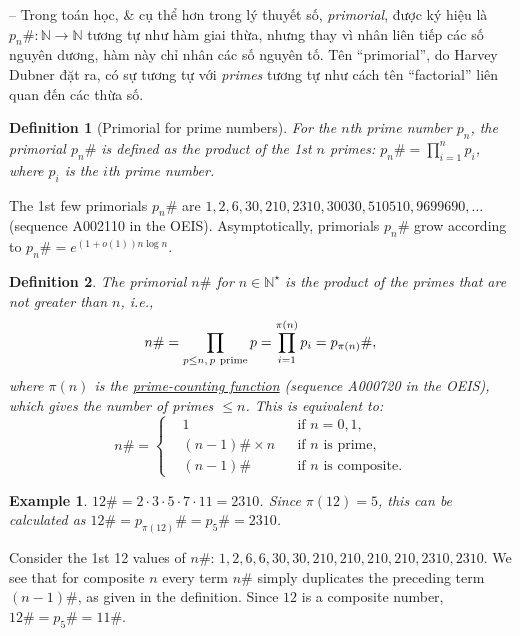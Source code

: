 \documentclass{article}
\newtheorem{definition}{Definition}
\newtheorem{example}{Example}
\begin{document}
-- Trong toán học, \& cụ thể hơn trong lý thuyết số, {\it primorial}, được ký hiệu là $p_n\#:\mathbb{N}\to\mathbb{N}$ tương tự như hàm giai thừa, nhưng thay vì nhân liên tiếp các số nguyên dương, hàm này chỉ nhân các số nguyên tố. Tên ``primorial'', do {\sc Harvey Dubner} đặt ra, có sự tương tự với {\it primes} tương tự như cách tên ``factorial'' liên quan đến các thừa số.

\begin{definition}[Primorial for prime numbers]
	For the $n$th prime number $p_n$, the primorial $p_n\#$ is defined as the product of the 1st $n$ primes: $p_n\# = \prod_{i=1}^n p_i$, where $p_i$ is the $i$th prime number.
\end{definition}
The 1st few primorials $p_n\#$ are $1, 2, 6, 30, 210, 2310, 30030, 510510, 9699690,\ldots$ (sequence A002110 in the OEIS). Asymptotically, primorials $p_n\#$ grow according to $p_n\# = e^{(1 + o(1))n\log n}$.

\begin{definition}
	The primorial $n\#$ for $n\in\mathbb{N}^\star$ is the product of the primes that are not greater than $n$, i.e.,
	\begin{equation*}
		n\# = \prod_{p\le n,\,p\ {\rm prime}} p = \prod_{i=1}^{\pi(n)} p_i = p_{\pi(n)}\#,
	\end{equation*}
	where $\pi(n)$ is the \href{https://en.wikipedia.org/wiki/Prime-counting_function}{prime-counting function} (sequence A000720 in the OEIS), which gives the number of primes $\le n$. This is equivalent to:
	\begin{equation*}
		n\# = \left\{\begin{split}
			&1&&\mbox{if } n = 0,1,\\
			&(n - 1)\#\times n&&\mbox{if } n\mbox{ is prime},\\
			&(n - 1)\#&&\mbox{if } n\mbox{ is composite}.
		\end{split}\right.
	\end{equation*}
\end{definition}

\begin{example}
	$12\# = 2\cdot3\cdot5\cdot7\cdot11 = 2310$. Since $\pi(12) = 5$, this can be calculated as $12\# = p_{\pi(12)}\# = p_5\# = 2310$.
\end{example}
Consider the 1st 12 values of $n\#$: $1, 2, 6, 6, 30, 30, 210, 210, 210, 210, 2310, 2310$. We see that for composite $n$ every term $n\#$ simply duplicates the preceding term $(n - 1)\#$, as given in the definition. Since $12$ is a composite number, $12\# = p_5\# = 11\#$.
\end{document}
